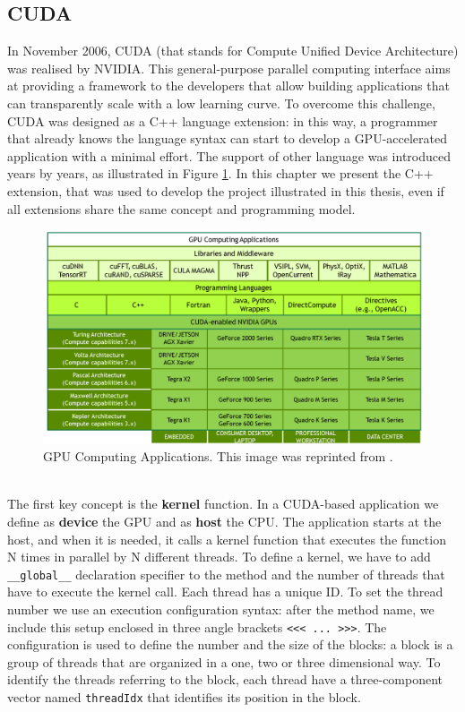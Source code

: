 \subsection{CUDA}
In November 2006, CUDA (that stands for Compute Unified Device Architecture) was realised by NVIDIA. This general-purpose parallel computing interface aims at providing a framework to the developers that allow building applications that can transparently scale with a low learning curve. To overcome this challenge, CUDA was designed as a C++ language extension: in this way, a programmer that already knows the language syntax can start to develop a GPU-accelerated application with a minimal effort. The support of other language was introduced years by years, as illustrated in Figure \ref{fig:gpu-computing-applications}. In this chapter we present the C++ extension, that was used to develop the project illustrated in this thesis, even if all extensions share the same concept and programming model.
\begin{figure}
	\centering
	\includegraphics[width=0.8\linewidth]{0-resources/gpu-computing-applications}
	\caption{GPU Computing Applications. This image was reprinted from \cite{cuda_manual}.}
	\label{fig:gpu-computing-applications}
\end{figure}\\
The first key concept is the \textbf{kernel} function. In a CUDA-based application we define as \textbf{device} the GPU and as \textbf{host} the CPU. The application starts at the host, and when it is needed, it calls a kernel function that executes the function N times in parallel by N different threads. To define a kernel, we have to add \verb|__global__| declaration specifier to the method and the number of threads that have to execute the kernel call. Each thread has a unique ID. To set the thread number we use an execution configuration syntax: after the method name, we include this setup enclosed in three angle brackets \verb|<<< ... >>>|. The configuration is used to define the number and the size of the blocks: a block is a group of threads that are organized in a one, two or three dimensional way. To identify the threads referring to the block, each thread have a three-component vector named \verb|threadIdx| that identifies its position in the block.
